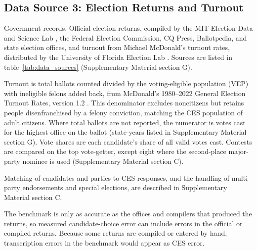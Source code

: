\documentclass[12pt]{article}
\begin{document}
\subsection*{Data Source 3: Election Returns and Turnout}

\begin{description}[style=unboxed, leftmargin=0pt, font=\normalfont\bfseries]
\item[Data Source:] Government records. Official election returns, compiled by the MIT Election Data and Science Lab \parencite{mit_election_data_and_science_lab_us_2017-1}, the Federal Election Commission, CQ Press, Ballotpedia, and state election offices, and turnout from Michael McDonald's turnout rates, distributed by the University of Florida Election Lab \parencite{mcdonald_voter_nodate}. Sources are listed in table~\ref{tab:data_sources} (Supplementary Material section G).

\item[Measurement:] Turnout is total ballots counted divided by the voting-eligible population (VEP) with ineligible felons added back, from McDonald's 1980--2022 General Election Turnout Rates, version 1.2 \parencite{mcdonald_voter_nodate}. This denominator excludes noncitizens but retains people disenfranchised by a felony conviction, matching the CES population of adult citizens. Where total ballots are not reported, the numerator is votes cast for the highest office on the ballot (state-years listed in Supplementary Material section G). Vote shares are each candidate's share of all valid votes cast. Contests are compared on the top vote-getter, except eight where the second-place major-party nominee is used (Supplementary Material section C).

\item[Processing:] Matching of candidates and parties to CES responses, and the handling of multi-party endorsements and special elections, are described in Supplementary Material section C.

\item[Limitations:] The benchmark is only as accurate as the offices and compilers that produced the returns, so measured candidate-choice error can include errors in the official or compiled returns. Because some returns are compiled or entered by hand, transcription errors in the benchmark would appear as CES error.
\end{description}

\clearpage

\end{document}
